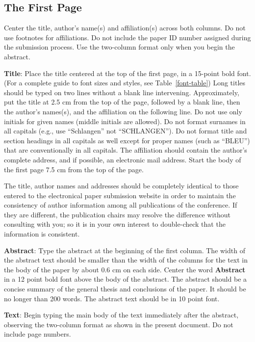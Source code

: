 \documentclass[11pt]{article}
\begin{document}
\subsection{The First Page}
\label{ssec:first}

Center the title, author's name(s) and affiliation(s) across both
columns. Do not use footnotes for affiliations. Do not include the
paper ID number assigned during the submission process. Use the
two-column format only when you begin the abstract.

  {\bf Title}: Place the title centered at the top of the first page, in
a 15-point bold font. (For a complete guide to font sizes and styles,
see Table~\ref{font-table}) Long titles should be typed on two lines
without a blank line intervening. Approximately, put the title at 2.5
cm from the top of the page, followed by a blank line, then the
author's names(s), and the affiliation on the following line. Do not
use only initials for given names (middle initials are allowed). Do
not format surnames in all capitals (e.g., use ``Schlangen'' not
``SCHLANGEN'').  Do not format title and section headings in all
capitals as well except for proper names (such as ``BLEU'') that are
conventionally in all capitals.  The affiliation should contain the
author's complete address, and if possible, an electronic mail
address. Start the body of the first page 7.5 cm from the top of the
page.

The title, author names and addresses should be completely identical
to those entered to the electronical paper submission website in order
to maintain the consistency of author information among all
publications of the conference. If they are different, the publication
chairs may resolve the difference without consulting with you; so it
is in your own interest to double-check that the information is
consistent.

  {\bf Abstract}: Type the abstract at the beginning of the first
column. The width of the abstract text should be smaller than the
width of the columns for the text in the body of the paper by about
0.6 cm on each side. Center the word {\bf Abstract} in a 12 point bold
font above the body of the abstract. The abstract should be a concise
summary of the general thesis and conclusions of the paper. It should
be no longer than 200 words. The abstract text should be in 10 point font.

  {\bf Text}: Begin typing the main body of the text immediately after
the abstract, observing the two-column format as shown in
the present document. Do not include page numbers.
\end{document}
